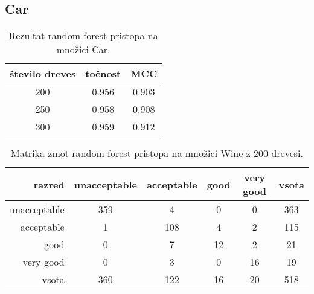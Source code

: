\subsection{Car}\label{subsec:random-forest-car-test}
\begin{table}[H]
    \begin{center}
        \begin{tabular}{|| c | c c ||}
            \hline
            število dreves & točnost & MCC   \\
            \hline
            200            & 0.956   & 0.903 \\
            \hline
            250            & 0.958   & 0.908 \\
            \hline
            300            & 0.959   & 0.912 \\
            \hline
        \end{tabular}
    \end{center}
    \caption{Rezultat random forest pristopa na množici Car.}
    \label{tab:rforest_car_result}
\end{table}

\begin{table}[H]
    \centering
    \begin{tabular}{||rccccc||}
        \hline
        razred       & unacceptable & acceptable & good & very good & vsota \\ \hline
        unacceptable & 359          & 4          & 0    & 0         & 363   \\ \hline
        acceptable   & 1            & 108        & 4    & 2         & 115   \\ \hline
        good         & 0            & 7          & 12   & 2         & 21    \\ \hline
        very good    & 0            & 3          & 0    & 16        & 19    \\ \hline
        vsota        & 360          & 122        & 16   & 20        & 518   \\ \hline
    \end{tabular}
    \caption{Matrika zmot random forest pristopa na množici Wine z 200 drevesi.}
    \label{tab:rforest_car_cm_1}
\end{table}

